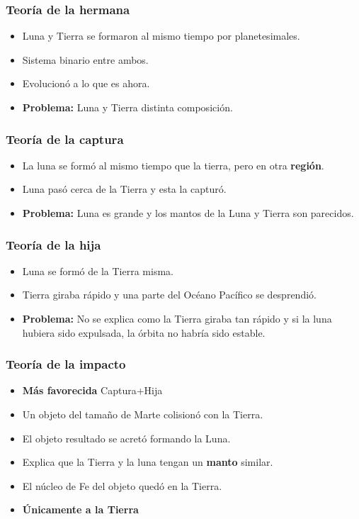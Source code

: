 \documentclass[11pt,fleqn]{book} %
\begin{document}
\subsubsection{Teoría de la hermana}
\begin{itemize}
    \item Luna y Tierra se formaron al mismo tiempo por planetesimales. 
    \item Sistema binario entre ambos. 
    \item Evolucionó a lo que es ahora. 
    \item \textbf{Problema: } Luna y Tierra distinta composición. 
\end{itemize}
\subsubsection{Teoría de la captura}
\begin{itemize}
    \item La luna se formó al mismo tiempo que la tierra, pero en otra \textbf{región}. 
    \item Luna pasó cerca de la Tierra y esta la capturó. 
    \item \textbf{Problema: }Luna es grande y los mantos de la Luna y Tierra son parecidos.
\end{itemize}
\subsubsection{Teoría de la hija}
\begin{itemize}
    \item Luna se formó de la Tierra misma. 
    \item Tierra giraba rápido y una parte del Océano Pacífico se desprendió. 
    \item \textbf{Problema: } No se explica como la Tierra giraba tan rápido y si la luna hubiera sido expulsada, la órbita no habría sido estable. 
\end{itemize}
\subsubsection{Teoría de la impacto}

\begin{itemize}
    \item \textbf{Más favorecida} Captura+Hija
    \item Un objeto del tamaño de Marte colisionó con la Tierra. 
    \item El objeto resultado se acretó formando la Luna. 
    \item Explica que la Tierra y la luna tengan un \textbf{manto} similar. 
    \item El núcleo de Fe del objeto quedó en la Tierra. 
    \item \textbf{Únicamente a la Tierra}
\end{itemize}
\end{document}
